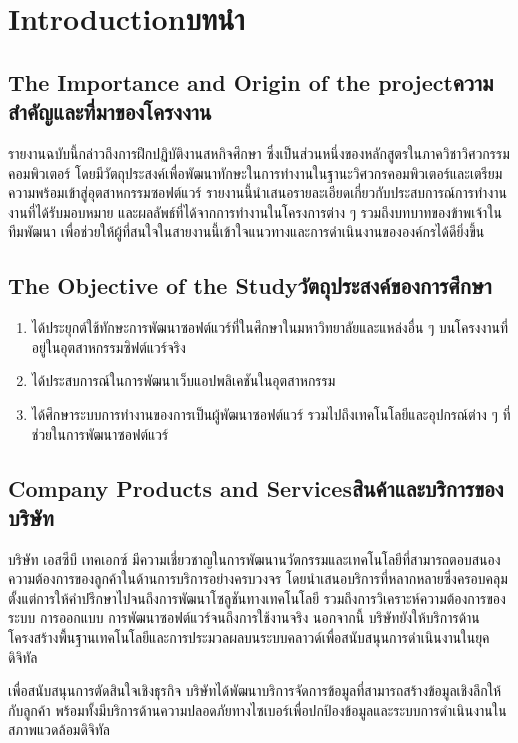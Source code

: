 \chapter{\ifenglish Introduction\else บทนำ\fi}

\section{\ifenglish The Importance and Origin of the 
project\else ความสำคัญและที่มาของโครงงาน\fi}
รายงานฉบับนี้กล่าวถึงการฝึกปฏิบัติงานสหกิจศึกษา ซึ่งเป็นส่วนหนึ่งของหลักสูตรในภาควิชาวิศวกรรมคอมพิวเตอร์ โดยมีวัตถุประสงค์เพื่อพัฒนาทักษะในการทำงานในฐานะวิศวกรคอมพิวเตอร์และเตรียมความพร้อมเข้าสู่อุตสาหกรรมซอฟต์แวร์ รายงานนี้นำเสนอรายละเอียดเกี่ยวกับประสบการณ์การทำงาน งานที่ได้รับมอบหมาย และผลลัพธ์ที่ได้จากการทำงานในโครงการต่าง ๆ รวมถึงบทบาทของข้าพเจ้าในทีมพัฒนา เพื่อช่วยให้ผู้ที่สนใจในสายงานนี้เข้าใจแนวทางและการดำเนินงานขององค์กรได้ดียิ่งขึ้น


\section{\ifenglish The Objective of the Study\else วัตถุประสงค์ของการศึกษา\fi}
\begin{enumerate}
    \item ได้ประยุกต์ใช้ทักษะการพัฒนาซอฟต์แวร์ที่ในศึกษาในมหาวิทยาลัยและแหล่งอื่น ๆ บนโครงงานที่อยู่ในอุตสาหกรรมซิฟต์แวร์จริง
    \item ได้ประสบการณ์ในการพัฒนาเว็บแอปพลิเคชันในอุตสาหกรรม
    \item ได้ศึกษาระบบการทำงานของการเป็นผู้พัฒนาซอฟต์แวร์ รวมไปถึงเทคโนโลยีและอุปกรณ์ต่าง ๆ ที่ช่วยในการพัฒนาซอฟต์แวร์
\end{enumerate}

\section{\ifenglish Company Products and Services\else สินค้าและบริการของบริษัท \fi}
บริษัท เอสซีบี เทคเอกซ์ มีความเชี่ยวชาญในการพัฒนานวัตกรรมและเทคโนโลยีที่สามารถตอบสนองความต้องการของลูกค้าในด้านการบริการอย่างครบวงจร โดยนำเสนอบริการที่หลากหลายซึ่งครอบคลุมตั้งแต่การให้คำปรึกษาไปจนถึงการพัฒนาโซลูชันทางเทคโนโลยี รวมถึงการวิเคราะห์ความต้องการของระบบ การออกแบบ การพัฒนาซอฟต์แวร์จนถึงการใช้งานจริง นอกจากนี้ บริษัทยังให้บริการด้านโครงสร้างพื้นฐานเทคโนโลยีและการประมวลผลบนระบบคลาวด์เพื่อสนับสนุนการดำเนินงานในยุคดิจิทัล

เพื่อสนับสนุนการตัดสินใจเชิงธุรกิจ บริษัทได้พัฒนาบริการจัดการข้อมูลที่สามารถสร้างข้อมูลเชิงลึกให้กับลูกค้า พร้อมทั้งมีบริการด้านความปลอดภัยทางไซเบอร์เพื่อปกป้องข้อมูลและระบบการดำเนินงานในสภาพแวดล้อมดิจิทัล



